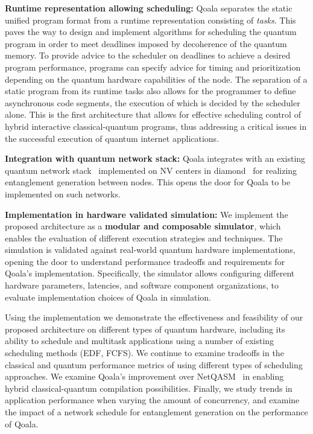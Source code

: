\textbf{Runtime representation allowing scheduling:} Qoala separates the static unified program format from a runtime representation consisting of \textit{tasks}. 
This paves the way to design and implement algorithms for scheduling the quantum program in order to meet deadlines imposed by decoherence of the quantum memory.  
To provide advice to the scheduler on deadlines to achieve a desired program performance, programs can specify advice for timing and prioritization depending 
on the quantum hardware capabilities of the node. 
The separation of a static program from its runtime tasks also allows for the programmer to define asynchronous code segments, the execution of which is decided by the scheduler alone.
This is the first architecture that allows for effective scheduling control of hybrid interactive classical-quantum programs, thus addressing a critical issues in the successful execution of quantum internet applications.

\textbf{Integration with quantum network stack:}
Qoala integrates with an existing quantum network stack~\cite{dahlberg2019link} implemented on NV centers in diamond~\cite{pompili2022experimental} for realizing entanglement generation between nodes. This opens the door for Qoala to be implemented on such networks.

\textbf{Implementation in hardware validated simulation:} We implement the proposed architecture as a \textbf{modular and composable simulator}, which enables the evaluation of different execution strategies and techniques.
The simulation is validated against real-world quantum hardware implementations, opening the door to understand performance tradeoffs and requirements for Qoala's implementation. Specifically, the simulator allows 
configuring different hardware parameters, latencies, and software component organizations, to evaluate implementation choices of Qoala in simulation. 

Using the implementation we demonstrate the effectiveness and feasibility of our proposed architecture on different types of quantum hardware, including its ability to schedule and multitask applications using a number of existing scheduling methods (EDF, FCFS).
We continue to examine tradeoffs in the classical and quantum performance metrics of using different types of scheduling approaches. 
We examine Qoala's improvement over NetQASM~\cite{dahlberg2022netqasm} in enabling hybrid classical-quantum compilation possibilities. 
Finally, we study trends in application performance when varying the amount of concurrency, and examine the impact of a network schedule for entanglement generation on the performance of Qoala.

